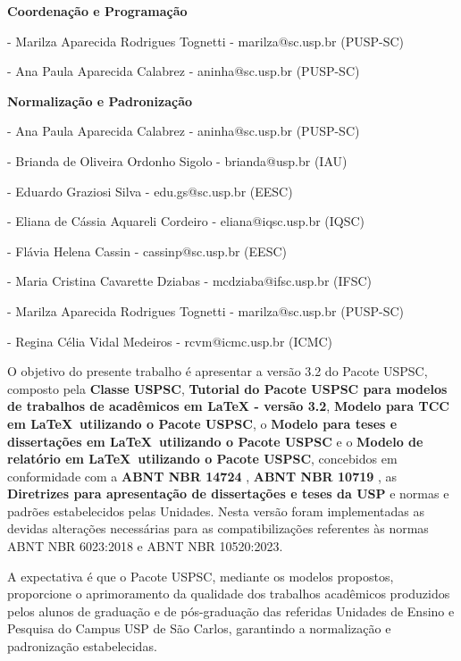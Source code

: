 \textbf{Coordenação e Programação}

- Marilza Aparecida Rodrigues Tognetti - marilza@sc.usp.br (PUSP-SC)	

- Ana Paula Aparecida Calabrez - aninha@sc.usp.br (PUSP-SC) 

\textbf{Normalização e Padronização}

- Ana Paula Aparecida Calabrez - aninha@sc.usp.br (PUSP-SC)

- Brianda de Oliveira Ordonho Sigolo - brianda@usp.br (IAU)

- Eduardo Graziosi Silva - edu.gs@sc.usp.br (EESC)

- Eliana de Cássia Aquareli Cordeiro - eliana@iqsc.usp.br (IQSC)

- Flávia Helena Cassin - cassinp@sc.usp.br (EESC)	

- Maria Cristina Cavarette Dziabas - mcdziaba@ifsc.usp.br (IFSC)	

- Marilza Aparecida Rodrigues Tognetti - marilza@sc.usp.br (PUSP-SC)

- Regina Célia Vidal Medeiros - rcvm@icmc.usp.br (ICMC)

	O objetivo do presente trabalho é apresentar a versão 3.2 do Pacote USPSC, composto pela \textbf{Classe USPSC}, \textbf{Tutorial do Pacote USPSC para modelos de trabalhos de acad\^emicos em LaTeX - vers\~ao 3.2},  \textbf{Modelo para TCC em \LaTeX\ utilizando o Pacote USPSC}, o \textbf{Modelo para teses e dissertações em \LaTeX\ utilizando o Pacote USPSC} e o \textbf{Modelo de relatório em \LaTeX\ utilizando o Pacote USPSC}, concebidos em conformidade com a \textbf{ABNT NBR 14724} \cite{nbr14724}, \textbf{ABNT NBR 10719} \cite{nbr107192015}, as \textbf{Diretrizes para apresentação de dissertações e teses da USP} \cite{aguia2020} e normas e padrões estabelecidos pelas Unidades. Nesta versão foram implementadas as devidas alterações necessárias para as compatibilizações referentes às normas ABNT NBR 6023:2018 e ABNT NBR 10520:2023.

	A expectativa é que o Pacote USPSC, mediante os modelos propostos, proporcione o aprimoramento da qualidade dos trabalhos acadêmicos produzidos pelos alunos de graduação e de pós-graduação das referidas Unidades de Ensino e Pesquisa do Campus USP de São Carlos, garantindo a normalização e padronização estabelecidas.
	
	